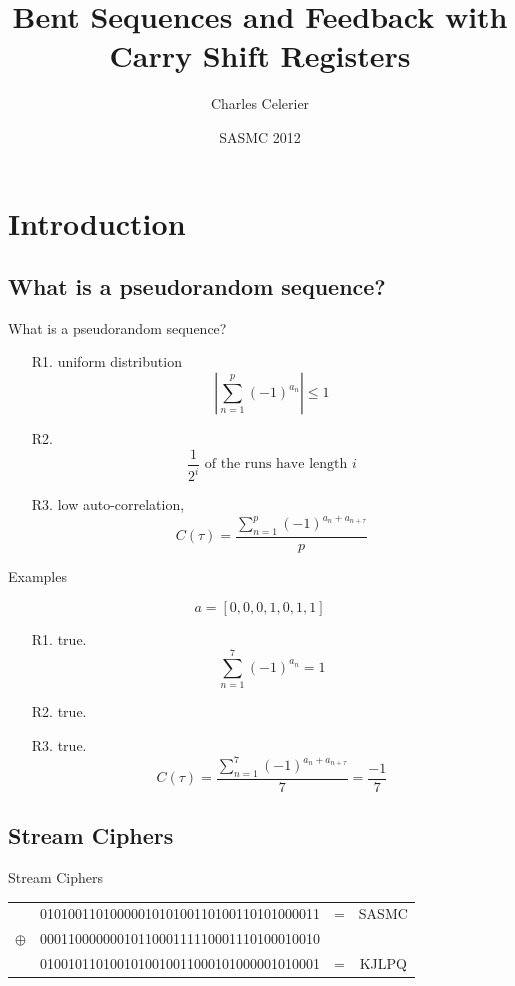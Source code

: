 \documentclass{beamer}
\begin{document}
\title{Bent Sequences and Feedback with Carry Shift Registers}
\author{Charles Celerier}
\date{SASMC 2012}
\frame{\titlepage}

\section{Introduction}
\subsection{What is a pseudorandom sequence?}
\begin{frame}{What is a pseudorandom sequence?}
  \begin{itemize}
      \pause
    \item[R1.] uniform distribution \[|\sum_{n=1}^p(-1)^{a_n}|\leq1\]
      \pause
    \item[R2.] \[\frac{1}{2^i}\text{ of the runs have length } i\]
      \pause
    \item[R3.] low auto-correlation, \[C(\tau)
      =\frac{\sum_{n=1}^p(-1)^{a_n+a_{n+\tau}}}{p}\]
  \end{itemize}
\end{frame}

\begin{frame}{Examples}
  \begin{example}
    \[
    a = [0,0,0,1,0,1,1]
    \]
    \begin{itemize}
        \pause
      \item[R1.] true. \[\sum_{n=1}^7(-1)^{a_n}=1\]
        \pause
      \item[R2.] true. 
        \pause
      \item[R3.] true. \[C(\tau)=\frac{\sum_{n=1}^7(-1)^{a_n+a_{n+\tau}}}{7}
        =\frac{-1}{7}\]
    \end{itemize}
  \end{example}
\end{frame}

\subsection{Stream Ciphers}
\begin{frame}{Stream Ciphers}
  \begin{tabular}{c c c c}
    \pause
              & 0101001101000001010100110100110101000011 & = & SASMC\\
              \pause
     $\oplus$ & 0001100000001011000111110001110100010010 & \\
              \hline 
              \pause
              & 0100101101001010010011000101000001010001 & = & KJLPQ
  \end{tabular}
\end{frame}
\end{document}
